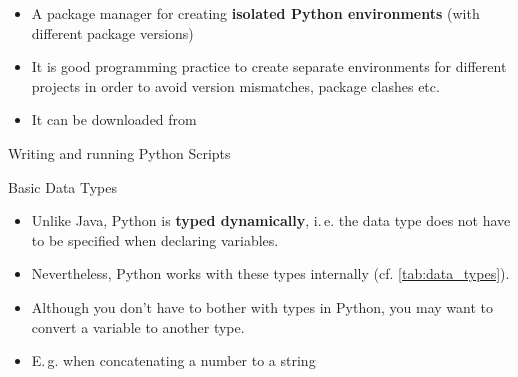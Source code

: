 \begin{frame}
	\begin{itemize}
		\item A package manager for creating \textbf{isolated Python environments} (with different package versions)
		\item It is good programming practice to create separate environments for different projects in order to avoid version mismatches,
			package clashes etc.
		\item It can be downloaded from 
	\end{itemize}
	
\end{frame}


\begin{dwHeaderFrame}{Writing and running Python Scripts}

\end{dwHeaderFrame}


\begin{frame}
	
\end{frame}



\begin{dwHeaderFrame}{Basic Data Types}
	\begin{itemize}
		\item Unlike Java, Python is \textbf{typed dynamically}, i.\,e. the data type does not have to be specified when declaring variables.
		\item Nevertheless, Python works with these types internally (cf. \cref{tab:data_types}).
	\end{itemize}
	
	
\end{dwHeaderFrame}


\begin{frame}
	
\end{frame}


\begin{frame}{}
	\begin{itemize}
		\item Although you don't have to bother with types in Python, you may want to convert a variable to another type.
		\item E.\,g. when concatenating a number to a string
	\end{itemize}
	
	
\end{frame}


